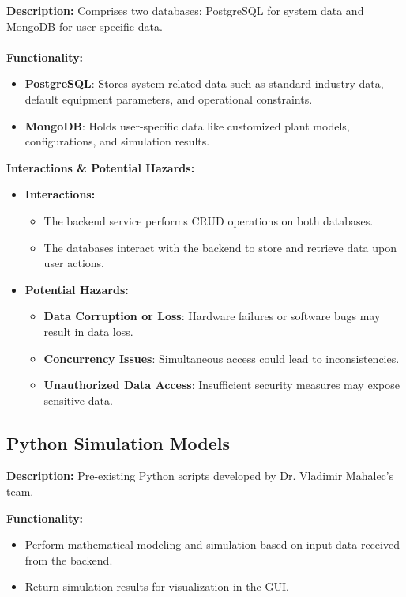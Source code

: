 \documentclass{article}
\begin{document}
\textbf{Description:}
Comprises two databases: PostgreSQL for system data and MongoDB for user-specific data.
\\\\
\textbf{Functionality:}
\begin{itemize}
    \item \textbf{PostgreSQL}: Stores system-related data such as standard industry data, default equipment parameters, and operational constraints.
    \item \textbf{MongoDB}: Holds user-specific data like customized plant models, configurations, and simulation results.
    
\end{itemize}
\textbf{Interactions \& Potential Hazards:}
\begin{itemize}
    \item \textbf{Interactions:}
    \begin{itemize}
        \item The backend service performs CRUD operations on both databases.
        \item The databases interact with the backend to store and retrieve data upon user actions.
    \end{itemize}
    \item \textbf{Potential Hazards:}
    \begin{itemize}
        \item \textbf{Data Corruption or Loss}: Hardware failures or software bugs may result in data loss.
        \item \textbf{Concurrency Issues}: Simultaneous access could lead to inconsistencies.
        \item \textbf{Unauthorized Data Access}: Insufficient security measures may expose sensitive data.
    \end{itemize}
\end{itemize}

\subsection{Python Simulation Models}

\textbf{Description:}
Pre-existing Python scripts developed by Dr. Vladimir Mahalec’s team.

\textbf{Functionality:}
\begin{itemize}
    \item Perform mathematical modeling and simulation based on input data received from the backend.
    \item Return simulation results for visualization in the GUI.
    
\end{itemize}
\end{document}
